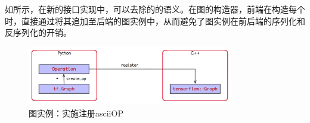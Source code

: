 \begin{content}
如所示，在新的接口实现中，可以去除的的语义。在图的构造器，前端在构造每个时，直接通过将其追加至后端的图实例中，从而避免了图实例在前后端的序列化和反序列化的开销。

\begin{figure}[H]
\centering
\includegraphics[width=0.8\textwidth]{figures/tf-new-session-interface.png}
\caption{图实例：实施注册ascii{OP}}
 \label{fig:tf-new-session-interface}
\end{figure}

\end{content}
